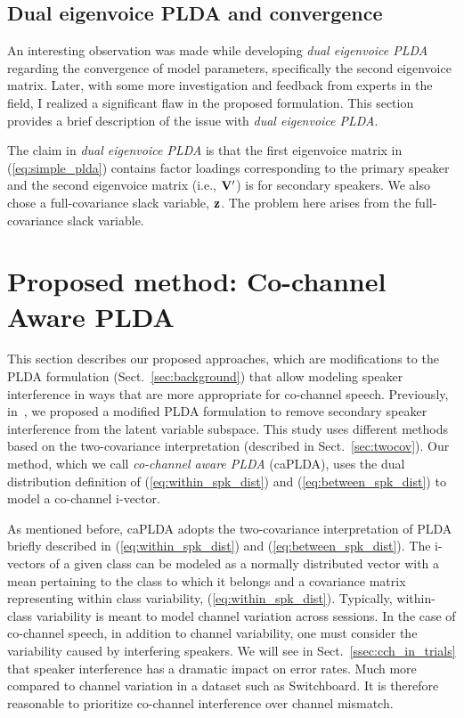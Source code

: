 \subsection{Dual eigenvoice PLDA and convergence}
\label{ssec:convergence_dualevplda}
An interesting observation was made while developing {\it dual eigenvoice PLDA} regarding the convergence of model parameters, specifically the second eigenvoice matrix. 
Later, with some more investigation and feedback from experts in the field, I realized a significant flaw in the proposed formulation. 
This section provides a brief description of the issue with {\it dual eigenvoice PLDA}. 

The claim in {\it dual eigenvoice PLDA} is that the first eigenvoice matrix in (\ref{eq:simple_plda}) contains factor loadings corresponding to the primary speaker and the second eigenvoice matrix (i.e., ${\bf V}^\prime$) is for secondary speakers. 
We also chose a full-covariance slack variable, ${\bf z}$. 
The problem here arises from the full-covariance slack variable. 


\section{Proposed method: Co-channel Aware PLDA}
\label{sec:cch_plda}
This section describes our proposed approaches, which are modifications to the PLDA formulation (Sect.~\ref{sec:background}) that allow modeling speaker interference in ways that are more appropriate for co-channel speech. 
Previously, in~\cite{shokouhi2015probabilistic}, we proposed a modified PLDA formulation to remove secondary speaker interference from the latent variable subspace. 
This study uses different methods based on the two-covariance interpretation (described in Sect.~\ref{sec:twocov}). 
Our method, which we call {\it co-channel aware PLDA} (caPLDA), uses the dual distribution definition of (\ref{eq:within_spk_dist}) and (\ref{eq:between_spk_dist}) to model a co-channel i-vector. 

As mentioned before, caPLDA adopts the two-covariance interpretation of PLDA briefly described in (\ref{eq:within_spk_dist}) and (\ref{eq:between_spk_dist}). 
The i-vectors of a given class can be modeled as a normally distributed vector with a mean pertaining to the class to which it belongs and a covariance matrix representing within class variability, (\ref{eq:within_spk_dist}). 
Typically, within-class variability is meant to model channel variation across sessions. 
In the case of co-channel speech, in addition to channel variability, one must consider the variability caused by interfering speakers. 
We will see in Sect.~\ref{ssec:cch_in_trials} that speaker interference has a dramatic impact on error rates. Much more compared to channel variation in a dataset such as Switchboard. 
It is therefore reasonable to prioritize co-channel interference over channel mismatch. 

